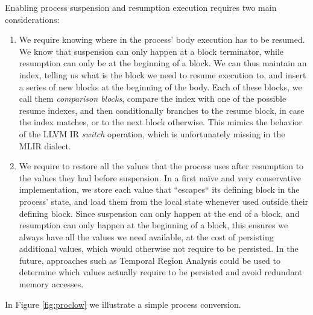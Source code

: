 Enabling process suspension and resumption execution requires two main considerations:
\begin{enumerate}
    \item We require knowing where in the process' body execution has to be resumed. We know that suspension can only happen at a block terminator, while resumption can only be at the beginning of a block. We can thus maintain an index, telling us what is the block we need to resume execution to, and insert a series of new blocks at the beginning of the body. Each of these blocks, we call them \textit{comparison blocks}, compare the index with one of the possible resume indexes, and then conditionally branches to the resume block, in case the index matches, or to the next block otherwise. This mimics the behavior of the LLVM IR \textit{switch} operation, which is unfortunately missing in the MLIR dialect.
    \item We require to restore all the values that the process uses after resumption to the values they had before suspension. In a first naïve and very conservative implementation, we store each value that “escapes“ its defining block in the process' state, and load them from the local state whenever used outside their defining block. Since suspension can only happen at the end of a block, and resumption can only happen at the beginning of a block, this ensures we always have all the values we need available, at the cost of persisting additional values, which would otherwise not require to be persisted. In the future, approaches such as Temporal Region Analysis could be used to determine which values actually require to be persisted and avoid redundant memory accesses.
\end{enumerate}

In Figure \ref{fig:proclow} we illustrate a simple process conversion.

